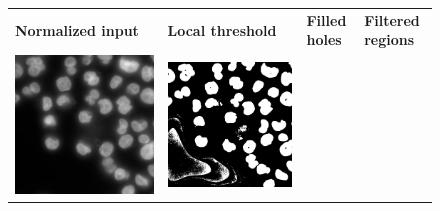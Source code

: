 \begin{figure}[htb]
    \centering
    \centering
        \begin{tabularx}{\textwidth}{YYYY}
            \textbf{Normalized input} &
            \textbf{Local threshold} &
            \textbf{Filled holes} &
            \textbf{Filtered regions} \\
            \includegraphics{bilder/segmentation/nuclei-mask/normalized.png} & \includegraphics{bilder/segmentation/nuclei-mask/binary_local.png} &

\end{tabularx}
\end{figure}
